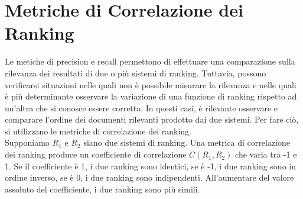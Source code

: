 \documentclass{report}
\begin{document}
	\section{Metriche di Correlazione dei Ranking}
	Le metiche di precision e recall permettono di effettuare una comparazione sulla rilevanza dei resultati di due o più sistemi di ranking. Tuttavia, possono verificarsi situazioni nelle quali non è possibile misurare la rilevanza e nelle quali è più determinante osservare la variazione di una funzione di ranking rispetto ad un'altra che si conosce essere corretta. In questi casi, è rilevante osservare e comparare l'ordine dei documenti rilevanti prodotto dai due sistemi. Per fare ciò, si utilizzano le metriche di correlazione dei ranking.
	\vspace{\baselineskip}\\
	Supponiamo $R_1$ e $R_2$ siano due sistemi di ranking. Una metrica di correlazione dei ranking produce un coefficiente di correlazione $C(R_1, R_2)$ che varia tra -1 e 1. Se il coefficiente è 1, i due ranking sono identici, se è -1, i due ranking sono in ordine inverso, se è 0, i due ranking sono indipendenti. All'aumentare del valore assoluto del coefficiente, i due ranking sono più simili.
\end{document}
